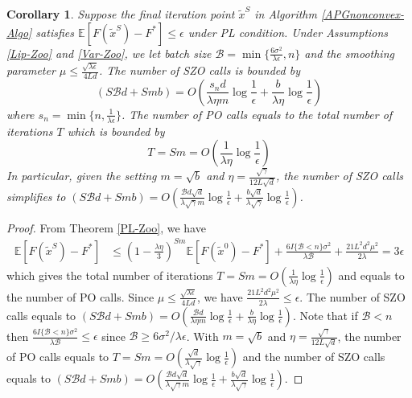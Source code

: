 \documentclass{article}
\newcommand*{\E}{\mathbb{E}}
\newtheorem{corollary}[theorem]{Corollary}
\theoremstyle{definition}
\theoremstyle{remark}
\begin{document}
\begin{corollary}\label{PL-Zo-Cor-rand}
Suppose the final iteration point $\tilde{x}^S$ in Algorithm \ref{APGnonconvex-Algo} satisfies $\E[F(\tilde{x}^S) - F^*]\leq \epsilon$ under PL condition. Under Assumptions \ref{Lip-Zoo} and \ref{Var-Zoo}, we let batch size $\mathcal{B} = \min\{\frac{6\sigma^2}{\lambda\epsilon},n\}$ and the smoothing parameter $\mu \leq \frac{\sqrt{\lambda\epsilon}}{4 L d}$. The number of SZO calls is bounded by
\[
(S\mathcal{B}d+Smb) = O(\frac{s_n d}{\lambda\eta m}\log\frac{1}{\epsilon}+\frac{b }{\lambda\eta}\log\frac{1}{\epsilon})
\]
where $s_n = \min \{n,\frac{1}{\lambda \epsilon}\}$.
The number of PO calls equals to the total number of iterations $T$ which is bounded by
\[
T = Sm = O(\frac{1}{\lambda\eta}\log\frac{1}{\epsilon})
\]
In particular, given the setting  $m=\sqrt{b}$ and $\eta = \frac{\sqrt{\gamma}}{12 L\sqrt{d}}$, the number of SZO calls  simplifies to 
$(S\mathcal{B}d+Smb) = O(\frac{\mathcal{B}d\sqrt{d}}{\lambda\sqrt{\gamma} m}\log\frac{1}{\epsilon}+\frac{b\sqrt{d}}{\lambda\sqrt{\gamma}}\log\frac{1}{\epsilon})$.
\end{corollary}
\begin{proof}
From Theorem \ref{PL-Zoo}, we have
\begin{align}
\E[F(\tilde{x}^S) - {F}^*] & \leq   \left(1-\frac{\lambda\eta}{3}\right)^{Sm} \E[F(\tilde{x}^0) - {F}^*] + \frac{6I\{\mathcal{B} < n\} \sigma ^2}{\lambda\mathcal{\mathcal{B}}}+\frac{21 L^2 d^2 \mu^2}{2\lambda}= 3 \epsilon
\end{align}
which gives the total number of iterations $T = Sm = O(\frac{1}{\lambda\eta}\log\frac{1}{\epsilon})$ and equals to the number of PO calls. Since $\mu \leq \frac{\sqrt{\lambda\epsilon}}{4 L d}$, we have $\frac{21 L^2 d^2 \mu^2}{2\lambda} \leq \epsilon$. The number of SZO calls equals to $(S\mathcal{B}d+Smb) = O(\frac{\mathcal{B}d}{\lambda\eta m}\log\frac{1}{\epsilon}+\frac{b}{\lambda\eta}\log\frac{1}{\epsilon})$.  Note that if $\mathcal{B} < n$ then $\frac{6I\{\mathcal{B} < n\} \sigma ^2}{\lambda\mathcal{B}} \leq \epsilon$ since $\mathcal{B} \geq 6 {\sigma ^2}/{\lambda \epsilon}$. With $m=\sqrt{b}$ and $\eta = \frac{\sqrt{\gamma}}{12 L\sqrt{d}}$, the number of PO calls equals to $T = Sm = O(\frac{\sqrt{d}}{\lambda\sqrt{\gamma}}\log\frac{1}{\epsilon})$ and the number of SZO calls equals to $(S\mathcal{B}d+Smb) = O(\frac{\mathcal{B}d\sqrt{d}}{\lambda\sqrt{\gamma} m}\log\frac{1}{\epsilon}+\frac{b\sqrt{d}}{\lambda\sqrt{\gamma}}\log\frac{1}{\epsilon})$.
\end{proof}
\end{document}
